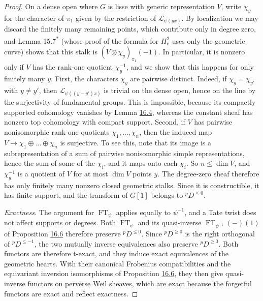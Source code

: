 \documentclass[11pt]{article}
\newcommand{\bpout}[1]{#1\textsuperscript{\hyperlink{bp-outside}{\ensuremath{\ast}}}}
\begin{document}
\begin{proof}[{Proof}]
On a dense open where \(G\) is lisse with generic representation \(V\), write \(\chi_y\) for the character of \(\pi_1\) given by the restriction of \(\mathcal L_{\psi(yx)}\). By localization we may discard the finitely many remaining points, which contribute only in degree zero, and Lemma \bpout{15.7} (whose proof of the formula for \(H^2_c\) uses only the geometric curve) shows that this stalk is \((V\otimes\chi_y)_{\pi_1}(-1)\). In particular, it is nonzero only if \(V\) has the rank-one quotient \(\chi_y^{-1}\), and we show that this happens for only finitely many \(y\). First, the characters \(\chi_y\) are pairwise distinct. Indeed, if \(\chi_y=\chi_{y'}\) with \(y\ne y'\), then \(\mathcal L_{\psi((y-y')x)}\) is trivial on the dense open, hence on the line by the surjectivity of fundamental groups. This is impossible, because its compactly supported cohomology vanishes by Lemma \hyperref[bp13]{16.4}, whereas the constant sheaf has nonzero top cohomology with compact support. Second, if \(V\) has pairwise nonisomorphic rank-one quotients \(\chi_1,\dots,\chi_n\), then the induced map \(V\to\chi_1\oplus\dots\oplus\chi_n\) is surjective. To see this, note that its image is a subrepresentation of a sum of pairwise nonisomorphic simple representations, hence the sum of some of the \(\chi_i\), and it maps onto each \(\chi_i\). So \(n\le\dim V\), and \(\chi_y^{-1}\) is a quotient of \(V\) for at most \(\dim V\) points \(y\). The degree-zero sheaf therefore has only finitely many nonzero closed geometric stalks. Since it is constructible, it has finite support, and the transform of \(G[1]\) belongs to \({}^pD^{\le0}\).

\emph{Exactness.} The argument for \(\operatorname{FT}_\psi\) applies equally to \(\psi^{-1}\), and a Tate twist does not affect supports or degrees. Both \(\operatorname{FT}_\psi\) and its quasi-inverse \(\operatorname{FT}_{\psi^{-1}}(-)(1)\) of Proposition \hyperref[bp19]{16.6} therefore preserve \({}^pD^{\le0}\). Since \({}^pD^{\ge0}\) is the right orthogonal of \({}^pD^{\le-1}\), the two mutually inverse equivalences also preserve \({}^pD^{\ge0}\). Both functors are therefore t-exact, and they induce exact equivalences of the geometric hearts. With their canonical Frobenius compatibilities and the equivariant inversion isomorphisms of Proposition \hyperref[bp19]{16.6}, they then give quasi-inverse functors on perverse Weil sheaves, which are exact because the forgetful functors are exact and reflect exactness.
\end{proof}
\end{document}
